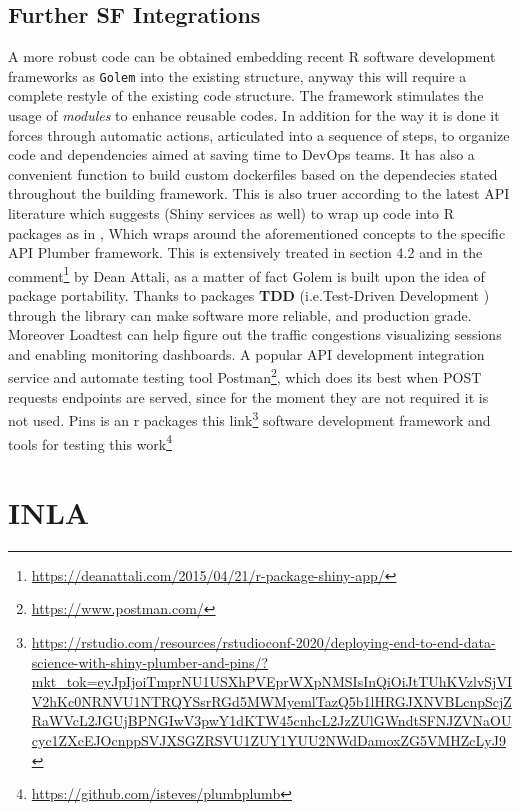 \documentclass[
  12pt,
  a4paper,
  oneside]{book}
\newcommand{\passthrough}[1]{#1}
\DeclareRobustCommand{\href}[2]{#2\footnote{\url{#1}}}
\theoremstyle{definition}
\theoremstyle{definition}
\theoremstyle{definition}
\theoremstyle{remark}
\begin{document}
\hypertarget{further-sf-integrations}{%
\section{Further SF Integrations}\label{further-sf-integrations}}

A more robust code can be obtained embedding recent R software development frameworks as \passthrough{\lstinline!Golem!} \citet{colin_fay_2020} into the existing structure, anyway this will require a complete restyle of the existing code structure. The framework stimulates the usage of \emph{modules} to enhance reusable codes. In addition for the way it is done it forces through automatic actions, articulated into a sequence of steps, to organize code and dependencies aimed at saving time to DevOps teams. It has also a convenient function to build custom dockerfiles based on the dependecies stated throughout the building framework.
This is also truer according to the latest API literature which suggests (Shiny services as well) to wrap up code into R packages as in \citet{plungr}, Which wraps around the aforementioned concepts to the specific API Plumber \citet{plumber} framework. This is extensively treated in section 4.2 \citet{colin_fay_2020} and in the \href{https://deanattali.com/2015/04/21/r-package-shiny-app/}{comment} by Dean Attali, as a matter of fact Golem is built upon the idea of package portability. Thanks to packages \textbf{TDD} (i.e.Test-Driven Development \citet{TDD_2004}) through the library \citet{testthat} can make software more reliable, and production grade. Moreover Loadtest \citet{loadtest} can help figure out the traffic congestions visualizing sessions and enabling monitoring dashboards.
A popular API development integration service and automate testing tool \href{https://www.postman.com/}{Postman}, which does its best when POST requests endpoints are served, since for the moment they are not required it is not used.
Pins is an r packages \href{https://rstudio.com/resources/rstudioconf-2020/deploying-end-to-end-data-science-with-shiny-plumber-and-pins/?mkt_tok=eyJpIjoiTmprNU1USXhPVEprWXpNMSIsInQiOiJtTUhKVzlvSjVIV2hKc0NRNVU1NTRQYSsrRGd5MWMyemlTazQ5b1lHRGJXNVBLcnpScjZRaWVcL2JGUjBPNGIwV3pwY1dKTW45cnhcL2JzZUlGWndtSFNJZVNaOUcyc1ZXcEJOcnppSVJXSGZRSVU1ZUY1YUU2NWdDamoxZG5VMHZcLyJ9}{this link}
software development framework and tools for testing \href{https://github.com/isteves/plumbplumb}{this work}

\hypertarget{inla}{%
\chapter{INLA}\label{inla}}
\end{document}
